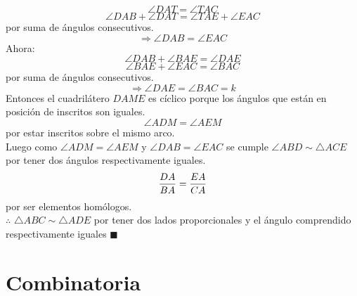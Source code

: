 \documentclass{book}
\begin{document}
\begin{enumerate}
          $$\angle DAT=\angle TAC$$
          $$\angle DAB+\angle DAT=\angle TAE+\angle EAC$$
          por suma de ángulos consecutivos.
          $$\Rightarrow\angle DAB=\angle EAC$$
          Ahora:
          $$\angle DAB+\angle BAE=\angle DAE$$
          $$\angle BAE+\angle EAC=\angle BAC$$
          por suma de ángulos consecutivos.
          $$\Rightarrow\angle DAE=\angle BAC=k$$
          Entonces el cuadrilátero $DAME$ es cíclico porque los ángulos que están en posición de inscritos son iguales.
          $$\angle ADM=\angle AEM$$
          por estar inscritos sobre el mismo arco.\\
          Luego como $\angle ADM=\angle AEM$ y $\angle DAB=\angle EAC$ se cumple $\angle ABD\sim\triangle ACE$ por tener dos ángulos respectivamente iguales.
          $${DA\over BA}={EA\over CA}$$
          por ser elementos homólogos.\\
          $\therefore$ $\triangle ABC\sim\triangle ADE$ por tener dos lados proporcionales y el ángulo comprendido respectivamente iguales $\blacksquare$\\
          
\end{enumerate}


\chapter{Combinatoria}
\end{document}
